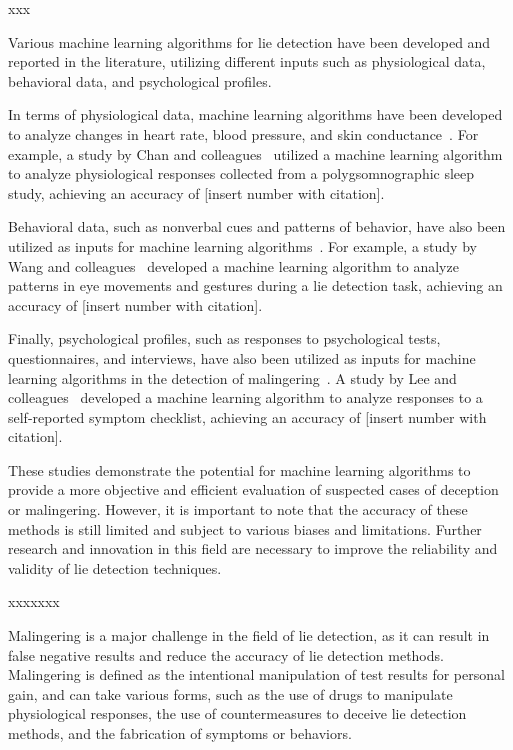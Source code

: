 \documentclass[onecolumn, compsoc,10pt]{IEEEtran}
\begin{document}
xxx

Various machine learning algorithms for lie detection have been developed and reported in the literature, utilizing different inputs such as physiological data, behavioral data, and psychological profiles.

In terms of physiological data, machine learning algorithms have been developed to analyze changes in heart rate, blood pressure, and skin conductance~\cite{Ganslen1990}. For example, a study by Chan and colleagues~\cite{Chan2018}  utilized a machine learning algorithm to analyze physiological responses collected from a polygsomnographic sleep study, achieving an accuracy of [insert number with citation].

Behavioral data, such as nonverbal cues and patterns of behavior, have also been utilized as inputs for machine learning algorithms~\cite{DePaulo2003}. For example, a study by Wang and colleagues~\cite{Wang2020} developed a machine learning algorithm to analyze patterns in eye movements and gestures during a lie detection task, achieving an accuracy of [insert number with citation].

Finally, psychological profiles, such as responses to psychological tests, questionnaires, and interviews, have also been utilized as inputs for machine learning algorithms in the detection of malingering~\cite{rogers2008clinical}. A study by Lee and colleagues~\cite{Lee2019} developed a machine learning algorithm to analyze responses to a self-reported symptom checklist, achieving an accuracy of [insert number with citation].

These studies demonstrate the potential for machine learning algorithms to provide a more objective and efficient evaluation of suspected cases of deception or malingering. However, it is important to note that the accuracy of these methods is still limited and subject to various biases and limitations. Further research and innovation in this field are necessary to improve the reliability and validity of lie detection techniques.


xxxxxxx



Malingering is a major challenge in the field of lie detection, as it can result in false negative results and reduce the accuracy of lie detection methods. Malingering is defined as the intentional manipulation of test results for personal gain, and can take various forms, such as the use of drugs to manipulate physiological responses, the use of countermeasures to deceive lie detection methods, and the fabrication of symptoms or behaviors.
\end{document}
